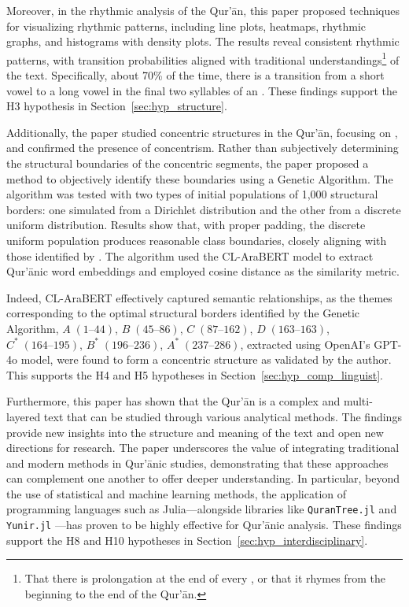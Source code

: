 Moreover, in the rhythmic analysis of the Qur'\=an, this paper proposed techniques for visualizing rhythmic patterns, including line plots, heatmaps, rhythmic graphs, and histograms with density plots. The results reveal consistent rhythmic patterns, with transition probabilities aligned with traditional understandings\footnote{That there is prolongation at the end of every  , or that it rhymes from the beginning to the end of the Qur'\=an.} of the text. Specifically, about 70\% of the time, there is a transition from a short vowel to a long vowel in the final two syllables of an  . These findings support the H3 hypothesis in Section~\ref{sec:hyp_structure}.

Additionally, the paper studied concentric structures in the Qur'\=an, focusing on  , and confirmed the presence of concentrism. Rather than subjectively determining the structural boundaries of the concentric segments, the paper proposed a method to objectively identify these boundaries using a Genetic Algorithm. The algorithm was tested with two types of initial populations of 1{,}000 structural borders: one simulated from a Dirichlet distribution and the other from a discrete uniform distribution. Results show that, with proper padding, the discrete uniform population produces reasonable class boundaries, closely aligning with those identified by . The algorithm used the CL-AraBERT model to extract Qur'\=anic word embeddings and employed cosine distance as the similarity metric.

Indeed, CL-AraBERT effectively captured semantic relationships, as the themes corresponding to the optimal structural borders identified by the Genetic Algorithm, $A\;(1\text{--}44)$, $B\;(45\text{--}86)$, $C\;(87\text{--}162)$, $D\;(163\text{--}163)$, $C^*\;(164\text{--}195)$, $B^*\;(196\text{--}236)$, $A^*\;(237\text{--}286)$, extracted using OpenAI's GPT-4o model, were found to form a concentric structure as validated by the author. This supports the H4 and H5 hypotheses in Section~\ref{sec:hyp_comp_linguist}.

Furthermore, this paper has shown that the Qur'\=an is a complex and multi-layered text that can be studied through various analytical methods. The findings provide new insights into the structure and meaning of the text and open new directions for research. The paper underscores the value of integrating traditional and modern methods in Qur'\=anic studies, demonstrating that these approaches can complement one another to offer deeper understanding. In particular, beyond the use of statistical and machine learning methods, the application of programming languages such as Julia—alongside libraries like \texttt{QuranTree.jl} \cite{asaad2021qurantree} and \texttt{Yunir.jl} \cite{al_ahmadgaid_b_asaad_yunir}—has proven to be highly effective for Qur'\=anic analysis. These findings support the H8 and H10 hypotheses in Section~\ref{sec:hyp_interdisciplinary}.

